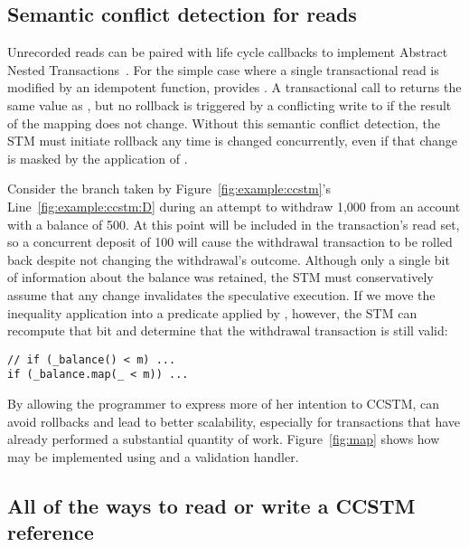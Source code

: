 \subsection{Semantic conflict detection for reads}
\label{sec:map}

Unrecorded reads can be paired with life cycle callbacks to implement
Abstract Nested Transactions~\cite{harris07abstract}.  For the simple case where
a single transactional read is modified by an idempotent function, 
provides
\code{map[}\code{](f: }\code{ => }\code{): }.
A transactional call to
 returns the same value as , but no rollback
is triggered by a conflicting write to  if the result of the mapping
does not change.  Without this
semantic conflict detection, the STM must initiate rollback any time 
is changed concurrently, even if that change is masked by the application of
.

Consider the branch taken by Figure~\ref{fig:example:ccstm}'s
Line~\ref{fig:example:ccstm:D} during an attempt to withdraw 1,000
 from an account with a balance of 500.  At this point
 will be included in the transaction's read set, so a
concurrent deposit of 100 will cause the withdrawal transaction to be
rolled back despite not changing the withdrawal's outcome.  Although only
a single bit of information about the balance was retained, the STM
must conservatively assume that any change invalidates the speculative
execution.  If we move the inequality application into a predicate
applied by , however, the STM can recompute that bit and
determine that the withdrawal transaction is still valid:
\lstset{numbers=none}
\begin{lstlisting}
// if (_balance() < m) ...
if (_balance.map(_ < m)) ...
\end{lstlisting}
\lstset{numbers=left}
By allowing the programmer to express more of her intention to CCSTM,
 can avoid rollbacks and lead to better scalability, especially for
transactions that have already performed a substantial quantity of work.
Figure~\ref{fig:map} shows how  may be implemented using
 and a validation handler.



\subsection{All of the ways to read or write a CCSTM reference}

